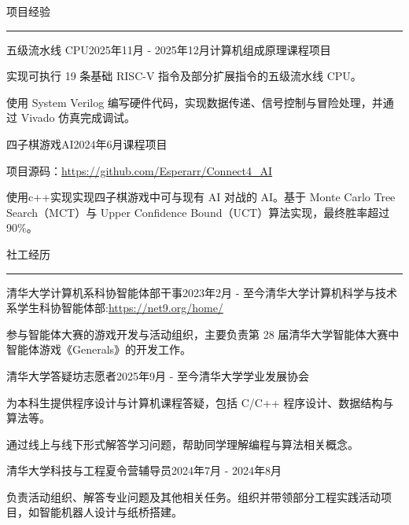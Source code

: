 \documentclass{resume} %
\renewenvironment{rSection}[1]{
\sectionskip
\textcolor{TsinghuaPurple}{\MakeUppercase{#1}}
\sectionlineskip
\hrule
\begin{list}{}{
\setlength{\leftmargin}{0em}
}
\item[]
}{
\end{list}
}
\begin{document}
\begin{rSection}{项目经验}
\begin{rSubsection}{五级流水线 CPU}{2025年11月 - 2025年12月}{计算机组成原理课程项目}{}
\item 实现可执行 19 条基础 RISC-V 指令及部分扩展指令的五级流水线 CPU。
\item 使用 System Verilog 编写硬件代码，实现数据传递、信号控制与冒险处理，并通过 Vivado 仿真完成调试。
\end{rSubsection}

\begin{rSubsection}{四子棋游戏AI}{2024年6月}{课程项目}{}
\item 项目源码：\url{https://github.com/Esperarr/Connect4_AI}
\item 使用c++实现实现四子棋游戏中可与现有 AI 对战的 AI。基于 Monte Carlo Tree Search（MCT）与 Upper Confidence Bound（UCT）算法实现，最终胜率超过 90\%。
\end{rSubsection}

\end{rSection}

\begin{rSection}{社工经历}

\begin{rSubsection}{清华大学计算机系科协智能体部干事}{2023年2月 - 至今}{清华大学计算机科学与技术系学生科协智能体部:\url{https://net9.org/home/}}{}              
\item 参与智能体大赛的游戏开发与活动组织，主要负责第 28 届清华大学智能体大赛中智能体游戏《Generals》的开发工作。
\end{rSubsection}  

\begin{rSubsection}{清华大学答疑坊志愿者}{2025年9月 - 至今}{清华大学学业发展协会}{}
\item 为本科生提供程序设计与计算机课程答疑，包括 C/C++ 程序设计、数据结构与算法等。
\item 通过线上与线下形式解答学习问题，帮助同学理解编程与算法相关概念。
\end{rSubsection}

\begin{rSubsection}{清华大学科技与工程夏令营辅导员}{2024年7月 - 2024年8月}{}{} 
\item 负责活动组织、解答专业问题及其他相关任务。组织并带领部分工程实践活动项目，如智能机器人设计与纸桥搭建。
\end{rSubsection}

\end{rSection}
\end{document}
